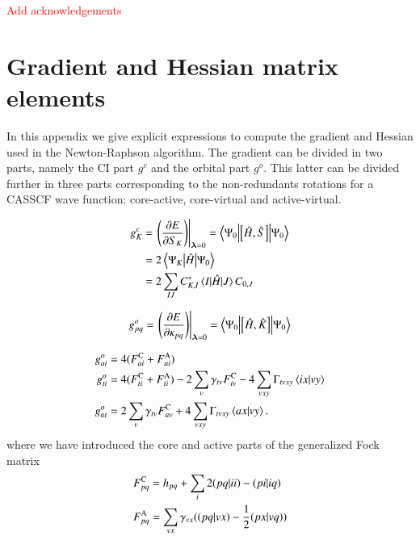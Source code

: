 \documentclass[aps,prb,reprint,showkeys,superscriptaddress]{revtex4-1}
\newcommand{\todo}[1]{\textcolor{red}{#1}}
\begin{document}
\begin{acknowledgements}
\todo{Add acknowledgements}
\end{acknowledgements}

\appendix

\section{Gradient and Hessian matrix elements}
\label{app:appendixA}

In this appendix we give explicit expressions to compute the gradient and Hessian used in the Newton-Raphson algorithm.
The gradient can be divided in two parts, namely the CI part $g^c$ and the orbital part $g^o$.
This latter can be divided further in three parts corresponding to the non-redundants rotations for a CASSCF wave function: core-active, core-virtual and active-virtual.

\begin{align}
  \label{eq:CASSCF_CI_Gradient}
  g^c_{K} &= \eval{\mleft(\pdv{E}{S_{K}}\mright)}_{\bm{\lambda}=0} = \mel**{\Psi_0}{\com{\hH}{\hS}}{\Psi_0} \\
          &= 2\mel**{\Psi_K}{\hH}{\Psi_0} \notag \\
          &= 2\sum_{IJ}C_{K,I}^*\mel{I}{\hH}{J}C_{0,J} \notag
\end{align}

\begin{equation}
  \label{eq:CASSCF_Orb_Gradient_general}
  g^o_{pq} = \eval{\mleft(\pdv{E}{\kappa_{pq}}\mright)}_{\bm{\lambda}=0} = \mel**{\Psi_0}{\com{\hH}{\hK}}{\Psi_0}
\end{equation}

\begin{subequations}
  \label{eq:CASSCF_Orb_Gradient}
  \begin{align}
    g^o_{ai} &= 4(F_{ai}^{\text{C}} + F_{ai}^{\text{A}}) \\
    g^o_{ti} &= 4(F_{ti}^{\text{C}} + F_{ti}^{\text{A}}) - 2\sum_v \gamma_{tv}F_{iv}^{\text{C}} -4\sum_{vxy}\Gamma_{tvxy}\braket{ix}{vy} \\
    g^o_{at} &= 2\sum_v \gamma_{tv}F_{av}^{\text{C}} + 4\sum_{vxy}\Gamma_{tvxy}\braket{ax}{vy}.
  \end{align}
\end{subequations}
where we have introduced the core and active parts of the generalized Fock matrix
\begin{align}
  \label{eq:CoreActGeneralizedFock}
  \FC{pq} &= h_{pq} + \sum_{i} 2\ceri{pq}{ii} - \ceri{pi}{iq} \\
  \FA{pq} &= \sum_{vx}\gamma_{vx}(\ceri{pq}{vx} - \frac{1}{2}\ceri{px}{vq})
\end{align}
\end{document}

